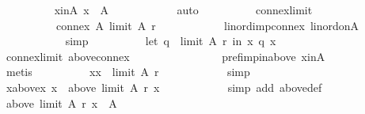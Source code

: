 \begin{isabellebody}
\ \ \ \ \ \ \ \ \isamarkupfalse%
\ x{\isacharunderscore}{\kern0pt}in{\isacharunderscore}{\kern0pt}A{\isacharcolon}{\kern0pt}\ {\isachardoublequoteopen}x\ {\isasymin}\ A{\isachardoublequoteclose}\isanewline
\ \ \ \ \ \ \ \ \ \ \isamarkupfalse%
\ auto\isanewline
\ \ \ \ \ \ \ \ \isamarkupfalse%
\ connex{\isacharunderscore}{\kern0pt}limit{\isacharcolon}{\kern0pt}\isanewline
\ \ \ \ \ \ \ \ \ \ {\isachardoublequoteopen}connex\ A\ {\isacharparenleft}{\kern0pt}limit\ A\ r{\isacharparenright}{\kern0pt}{\isachardoublequoteclose}\isanewline
\ \ \ \ \ \ \ \ \ \ \isamarkupfalse%
\ lin{\isacharunderscore}{\kern0pt}ord{\isacharunderscore}{\kern0pt}imp{\isacharunderscore}{\kern0pt}connex\ lin{\isacharunderscore}{\kern0pt}ord{\isacharunderscore}{\kern0pt}on{\isacharunderscore}{\kern0pt}A\isanewline
\ \ \ \ \ \ \ \ \ \ \isamarkupfalse%
\ simp\isanewline
\ \ \ \ \ \ \ \ \isamarkupfalse%
\ {\isachardoublequoteopen}let\ q\ {\isacharequal}{\kern0pt}\ limit\ A\ r\ in\ x\ {\isasympreceq}\isactrlsub q\ x{\isachardoublequoteclose}\isanewline
\ \ \ \ \ \ \ \ \ \ \isamarkupfalse%
\ connex{\isacharunderscore}{\kern0pt}limit\ above{\isacharunderscore}{\kern0pt}connex\isanewline
\ \ \ \ \ \ \ \ \ \ \ \ \ \ \ \ pref{\isacharunderscore}{\kern0pt}imp{\isacharunderscore}{\kern0pt}in{\isacharunderscore}{\kern0pt}above\ x{\isacharunderscore}{\kern0pt}in{\isacharunderscore}{\kern0pt}A\isanewline
\ \ \ \ \ \ \ \ \ \ \isamarkupfalse%
\ metis\isanewline
\ \ \ \ \ \ \ \ \isamarkupfalse%
\ {\isachardoublequoteopen}{\isacharparenleft}{\kern0pt}x{\isacharcomma}{\kern0pt}x{\isacharparenright}{\kern0pt}\ {\isasymin}\ limit\ A\ r{\isachardoublequoteclose}\isanewline
\ \ \ \ \ \ \ \ \ \ \isamarkupfalse%
\ simp\isanewline
\ \ \ \ \ \ \ \ \isamarkupfalse%
\ x{\isacharunderscore}{\kern0pt}above{\isacharunderscore}{\kern0pt}x{\isacharcolon}{\kern0pt}\ {\isachardoublequoteopen}x\ {\isasymin}\ above\ {\isacharparenleft}{\kern0pt}limit\ A\ r{\isacharparenright}{\kern0pt}\ x{\isachardoublequoteclose}\isanewline
\ \ \ \ \ \ \ \ \ \ \isamarkupfalse%
\ {\isacharparenleft}{\kern0pt}simp\ add{\isacharcolon}{\kern0pt}\ above{\isacharunderscore}{\kern0pt}def{\isacharparenright}{\kern0pt}\isanewline
\ \ \ \ \ \ \ \ \isamarkupfalse%
\ {\isachardoublequoteopen}above\ {\isacharparenleft}{\kern0pt}limit\ A\ r{\isacharparenright}{\kern0pt}\ x\ {\isasymsubseteq}\ A{\isachardoublequoteclose}\isanewline
\ \ \ \ \ \ \ \ \ \ \isamarkupfalse%

\end{isabellebody}
